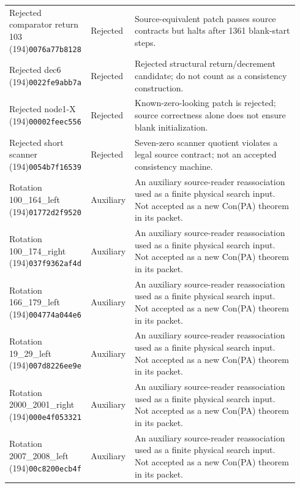 \begin{longtable}{@{}p{0.24\linewidth}p{0.14\linewidth}p{0.56\linewidth}@{}}
Rejected comparator return 103 (194)\newline\texttt{0076a77b8128} & Rejected & Source-equivalent patch passes source contracts but halts after 1361 blank-start steps.\\[4pt]
Rejected dec6 (194)\newline\texttt{0022fe9abb7a} & Rejected & Rejected structural return/decrement candidate; do not count as a consistency construction.\\[4pt]
Rejected node1-X (194)\newline\texttt{00002feec556} & Rejected & Known-zero-looking patch is rejected; source correctness alone does not ensure blank initialization.\\[4pt]
Rejected short scanner (194)\newline\texttt{0054b7f16539} & Rejected & Seven-zero scanner quotient violates a legal source contract; not an accepted consistency machine.\\[4pt]
Rotation 100\_164\_left (194)\newline\texttt{01772d2f9520} & Auxiliary & An auxiliary source-reader reassociation used as a finite physical search input. Not accepted as a new Con(PA) theorem in its packet.\\[4pt]
Rotation 100\_174\_right (194)\newline\texttt{037f9362af4d} & Auxiliary & An auxiliary source-reader reassociation used as a finite physical search input. Not accepted as a new Con(PA) theorem in its packet.\\[4pt]
Rotation 166\_179\_left (194)\newline\texttt{004774a044e6} & Auxiliary & An auxiliary source-reader reassociation used as a finite physical search input. Not accepted as a new Con(PA) theorem in its packet.\\[4pt]
Rotation 19\_29\_left (194)\newline\texttt{007d8226ee9e} & Auxiliary & An auxiliary source-reader reassociation used as a finite physical search input. Not accepted as a new Con(PA) theorem in its packet.\\[4pt]
Rotation 2000\_2001\_right (194)\newline\texttt{000e4f053321} & Auxiliary & An auxiliary source-reader reassociation used as a finite physical search input. Not accepted as a new Con(PA) theorem in its packet.\\[4pt]
Rotation 2007\_2008\_left (194)\newline\texttt{00c8200ecb4f} & Auxiliary & An auxiliary source-reader reassociation used as a finite physical search input. Not accepted as a new Con(PA) theorem in its packet.\\[4pt]

\end{longtable}
